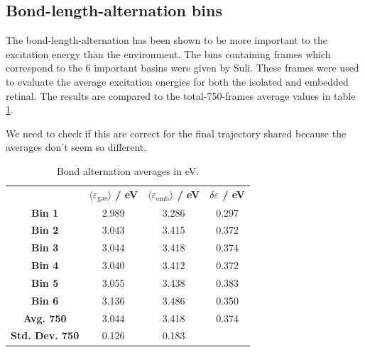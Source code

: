\documentclass[twoside, 12pt]{article}
\begin{document}
\subsection{Bond-length-alternation bins}
The bond-length-alternation has been shown to be more important to the excitation energy than the environment. The bins containing frames which correspond to the 6 important basins were given by Suli. These frames were used to evaluate the average excitation energies for both the isolated and embedded retinal. The results are compared to the total-750-frames average values in table \ref{tab:ex_bins}.

We need to check if this are correct for the final trajectory shared because the averages don't seem so different.

\begin{table}[h]
\footnotesize
\centering
\caption{Bond alternation averages in eV.}
\label{tab:ex_bins}
\begin{tabular}{cccc}
& \textbf{$\langle \varepsilon_\mathrm{gas} \rangle$ / eV} & \textbf{$\langle \varepsilon_\mathrm{emb} \rangle$ / eV} & \textbf{$\delta \varepsilon$ / eV}  \\ 
\textbf{Bin 1} & 2.989 & 3.286 & 0.297\\ 
\textbf{Bin 2} & 3.043 & 3.415 & 0.372\\ 
\textbf{Bin 3} & 3.044 & 3.418 & 0.374\\ 
\textbf{Bin 4} & 3.040 & 3.412 & 0.372\\ 
\textbf{Bin 5} & 3.055 & 3.438 & 0.383\\ 
\textbf{Bin 6} & 3.136 & 3.486 & 0.350\\ 
\textbf{Avg. 750} &  3.044 & 3.418 & 0.374\\ 
\textbf{Std. Dev. 750} &  0.126 & 0.183 &\\ 
\end{tabular}
\end{table}


\clearpage
%

\end{document}
